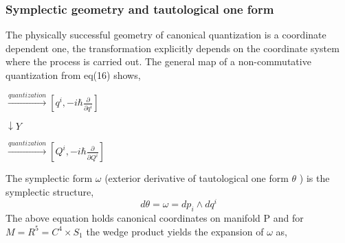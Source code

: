 \documentclass{article}
\begin{document}
\subsubsection{Symplectic geometry and tautological one form}
The physically successful geometry of canonical quantization is a coordinate dependent one\cite{19}, the transformation explicitly depends on the coordinate system where the process is carried out.  The general map of a non-commutative quantization from eq(16) shows,
\begin{center}
\begin{math}
     [q^i, p_i] \xrightarrow{quantization} [q^i, -i\hbar \frac{\partial}{\partial q^i}] 
     \end{math}
     \end{center}
 \begin{center}
 \begin{math}
    \downarrow Y
    \end{math}
 \end{center}
 \begin{center}
 \begin{math}
   [Q^i, P_i] \xrightarrow{quantization} [Q^i, -i\hbar \frac{\partial}{\partial Q^i}] 
 \end{math}
  \end{center}
The symplectic form $\omega$ (exterior derivative of tautological one form $\theta$ ) is the symplectic structure,
\begin{equation}
  d\theta = \omega = dp_i \wedge dq^i  
\end{equation}
    The above equation holds canonical coordinates on manifold P and for $ M= R^5 = C^4 \times S_1 $ the wedge product yields the expansion of $\omega$ as,
\end{document}
